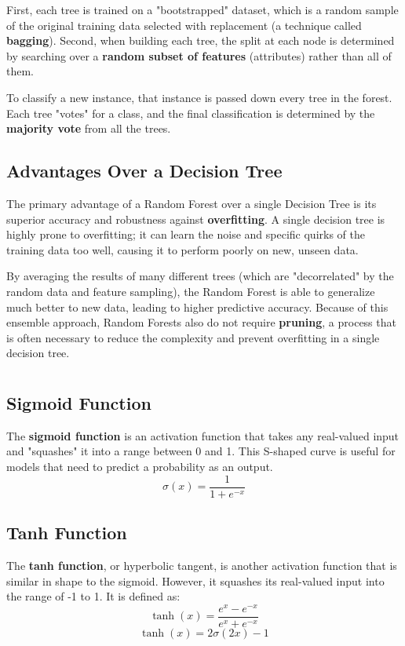 \documentclass[a4paper,12pt]{article}
\begin{document}
First, each tree is trained on a "bootstrapped" dataset, which is a random sample of the original training data selected with replacement (a technique called \textbf{bagging}). Second, when building each tree, the split at each node is determined by searching over a \textbf{random subset of features} (attributes) rather than all of them.

To classify a new instance, that instance is passed down every tree in the forest. Each tree "votes" for a class, and the final classification is determined by the \textbf{majority vote} from all the trees.

\subsection{Advantages Over a Decision Tree}
The primary advantage of a Random Forest over a single Decision Tree is its superior accuracy and robustness against \textbf{overfitting}. A single decision tree is highly prone to overfitting; it can learn the noise and specific quirks of the training data too well, causing it to perform poorly on new, unseen data.

By averaging the results of many different trees (which are "decorrelated" by the random data and feature sampling), the Random Forest is able to generalize much better to new data, leading to higher predictive accuracy. Because of this ensemble approach, Random Forests also do not require \textbf{pruning}, a process that is often necessary to reduce the complexity and prevent overfitting in a single decision tree.


\section{}

\subsection{Sigmoid Function}
The \textbf{sigmoid function} is an activation function that takes any real-valued input and "squashes" it into a range between 0 and 1. This S-shaped curve is useful for models that need to predict a probability as an output.
$$
\sigma(x) = \frac{1}{1 + e^{-x}}
$$
\text{ }
\subsection{Tanh Function}
The \textbf{tanh function}, or hyperbolic tangent, is another activation function that is similar in shape to the sigmoid. However, it squashes its real-valued input into the range of -1 to 1. It is defined as:
$$
\tanh(x) = \frac{e^{x} - e^{-x}}{e^{x} + e^{-x}}
$$
$$
\tanh(x) = 2\sigma(2x) - 1
$$
\text{ }
\end{document}
